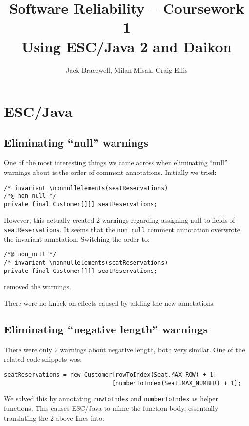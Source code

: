 \documentclass[11pt]{article}
\title{Software Reliability -- Coursework 1 \\ Using ESC/Java 2 and Daikon}
\author{Jack Bracewell, Milan Misak, Craig Ellis}
\date{}
\begin{document}
\maketitle

\section{ESC/Java}

\subsection{Eliminating ``null'' warnings}

One of the most interesting things we came across when eliminating ``null'' warnings about is the order of comment annotations. Initially we tried:

\noindent
\begin{verbatim}
/* invariant \nonnullelements(seatReservations)
/*@ non_null */
private final Customer[][] seatReservations;
\end{verbatim}

However, this actually created 2 warnings regarding assigning null to fields of \verb|seatReservations|. It seems that the \verb|non_null| comment annotation overwrote the invariant annotation. Switching the order to:

\noindent
\begin{verbatim}
/*@ non_null */
/* invariant \nonnullelements(seatReservations)
private final Customer[][] seatReservations;
\end{verbatim}

removed the warnings.

There were no knock-on effects caused by adding the new annotations.

\subsection{Eliminating ``negative length'' warnings}

There were only 2 warnings about negative length, both very similar. One of the related code snippets was:

\noindent
\begin{verbatim}
seatReservations = new Customer[rowToIndex(Seat.MAX_ROW) + 1]
                               [numberToIndex(Seat.MAX_NUMBER) + 1];
\end{verbatim}

We solved this by annotating \verb|rowToIndex| and \verb|numberToIndex| as helper functions. This causes ESC/Java to inline the function body, essentially translating the 2 above lines into:
\end{document}
